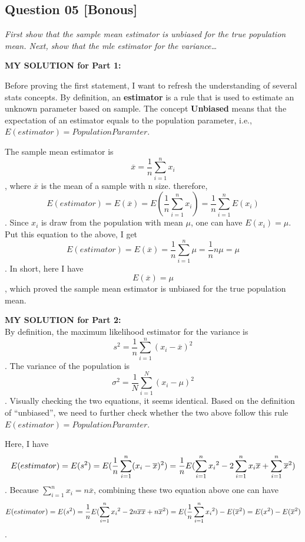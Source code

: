 \documentclass[
]{article}
\begin{document}
\hypertarget{question-05-bonous}{%
\subsection{Question 05 {[}Bonous{]}}\label{question-05-bonous}}

\emph{First show that the sample mean estimator is unbiased for the true
population mean. Next, show that the mle estimator for the
variance\ldots{}}

\textbf{MY SOLUTION for Part 1:}

Before proving the first statement, I want to refresh the understanding
of several stats concepts. By definition, an \textbf{estimator} is a
rule that is used to estimate an unknown parameter based on sample. The
concept \textbf{Unbiased} means that the expectation of an estimator
equals to the population parameter, i.e.,
\(E(estimator) = Population Paramter\).

The sample mean estimator is
\[\overline{x} = \frac{1}{n}\sum_{i = 1}^{n} x_{i}\], where
\(\overline{x}\) is the mean of a sample with n size. therefore,
\[E(estimator) = E(\overline{x})=E(\frac{1}{n}\sum_{i = 1}^{n} x_{i})= \frac{1}{n}\sum_{i = 1}^{n}E(x_i)\].
Since \(x_i\) is draw from the population with mean \(\mu\), one can
have \(E(x_i) = \mu\). Put this equation to the above, I get
\[E(estimator) = E(\overline{x}) = \frac{1}{n}\sum_{i = 1}^{n}\mu=\frac{1}{n}n\mu=\mu\].
In short, here I have \[E(\overline{x})= \mu\], which proved the sample
mean estimator is unbiased for the true population mean.

\textbf{MY SOLUTION for Part 2:}\\
By definition, the maximum likelihood estimator for the variance is
\[s^2=\frac{1}{n}\sum_{i = 1}^{n}(x_i-\overline{x})^2\]. The variance of
the population is \[\sigma^2=\frac{1}{N}\sum_{i = 1}^{N}(x_i-{\mu})^2\].
Visually checking the two equations, it seems identical. Based on the
definition of ``unbiased'', we need to further check whether the two
above follow this rule \(E(estimator) = Population Paramter\).

Here, I have
\[E(estimator) = E(s^2)=E(\frac{1}{n}\sum_{i = 1}^{n}(x_i-\overline{x})^2)=\\\frac{1}{n}E(\sum_{i = 1}^{n}{x_i}^2 - 2\sum_{i = 1}^{n}x_i\overline{x}+\sum_{i = 1}^{n}\overline{x}^2)\].
Because \(\sum_{i = 1}^{n}x_i = n\overline{x}\), combining these two
equation above one can have
\[E(estimator)=E(s^2)=\frac{1}{n}E(\sum_{i = 1}^{n}{x_i}^2 - 2n\overline{x}\overline{x}+n\overline{x}^2)=\\E(\frac{1}{n}\sum_{i = 1}^{n}{x_i}^2)-E(\overline{x}^2)=\\E(x^2)-E(\overline{x}^2)\].
\end{document}
